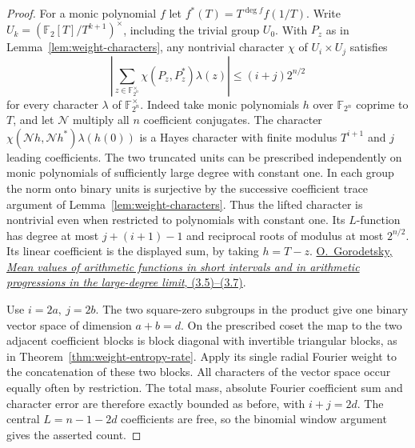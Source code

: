 \documentclass[11pt]{article}
\newcommand{\F}{\mathbb F_2}
\begin{document}
\begin{proof}
For a monic polynomial \(f\) let \(f^*(T)=T^{\deg f}f(1/T)\).
Write \(U_k=(\F[T]/T^{k+1})^\times\), including the trivial
group \(U_0\). With \(P_z\) as in Lemma~\ref{lem:weight-characters},
any nontrivial character \(\chi\) of \(U_i\times U_j\) satisfies
\[
 \left|\sum_{z\in\mathbb F_{2^n}^\times}
       \chi(P_z,P_z^*)\lambda(z)\right|\le(i+j)2^{n/2}
\]
for every character \(\lambda\) of \(\mathbb F_{2^n}^\times\).
Indeed take monic polynomials \(h\) over \(\mathbb F_{2^n}\)
coprime to \(T\), and let \(\mathcal N\) multiply all \(n\)
coefficient conjugates. The character
\(\chi(\mathcal N h,\mathcal N h^*)\lambda(h(0))\) is a Hayes
character with finite modulus \(T^{i+1}\) and \(j\) leading
coefficients. The two truncated units can be prescribed independently
on monic polynomials of sufficiently large degree with constant one.
In each group the norm onto binary units is surjective by the
successive coefficient trace argument of
Lemma~\ref{lem:weight-characters}. Thus the lifted character is
nontrivial even when restricted to polynomials with constant one.
Its \(L\)-function has degree at most \(j+(i+1)-1\) and reciprocal
roots of modulus at most \(2^{n/2}\). Its linear coefficient is the
displayed sum, by taking \(h=T-z\).
\href{https://arxiv.org/pdf/1810.00483\#page=7}{O.~Gorodetsky,
\emph{Mean values of arithmetic functions in short intervals and in
arithmetic progressions in the large-degree limit}, (3.5)--(3.7)}.

Use \(i=2a,\ j=2b\). The two square-zero subgroups in the product
give one binary vector space of dimension \(a+b=d\).
On the prescribed coset the map to the two adjacent coefficient
blocks is block diagonal with invertible triangular blocks, as in
Theorem~\ref{thm:weight-entropy-rate}. Apply its single radial
Fourier weight to the concatenation of these two blocks. All
characters of the vector space occur equally often by restriction.
The total mass, absolute Fourier coefficient sum and character
error are therefore exactly bounded as before, with \(i+j=2d\).
The central \(L=n-1-2d\) coefficients are free, so the binomial
window argument gives the asserted count.


\end{proof}
\end{document}
